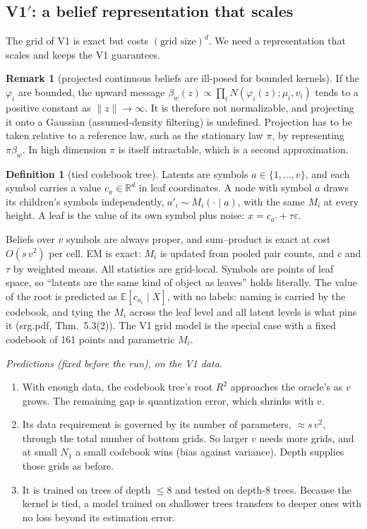 \documentclass[11pt]{article}
\theoremstyle{definition}
\newtheorem{definition}[theorem]{Definition}
\newtheorem{remark}[theorem]{Remark}
\newcommand{\E}{\mathbb{E}}
\newcommand{\norm}[1]{\lVert #1\rVert}
\newcommand{\R}{\mathbb R}
\begin{document}
\subsection{V1$'$: a belief representation that scales}\label{sec:v1p}
The grid of V1 is exact but costs $(\text{grid size})^d$. We need a representation that scales and keeps
the V1 guarantees.

\begin{remark}[projected continuous beliefs are ill-posed for bounded kernels]\label{rem:adf}
If the $\varphi_i$ are bounded, the upward message $\beta_w(z)\propto\prod_iN(\varphi_i(z);\mu_i,v_i)$ tends to a
positive constant as $\norm z\to\infty$. It is therefore not normalizable, and projecting it onto a
Gaussian (assumed-density filtering) is undefined. Projection has to be taken relative to a reference
law, such as the stationary law $\pi$, by representing $\pi\beta_w$. In high dimension $\pi$ is itself
intractable, which is a second approximation.
\end{remark}

\begin{definition}[tied codebook tree]\label{def:codebook}
Latents are symbols $a\in\{1,\dots,v\}$, and each symbol carries a value $c_a\in\R^d$ in leaf
coordinates. A node with symbol $a$ draws its children's symbols independently,
$a'_i\sim M_i(\cdot\mid a)$, with the same $M_i$ at every height. A leaf is the value of its own
symbol plus noise: $x=c_{a'}+\tau\varepsilon$.
\end{definition}
\noindent Beliefs over $v$ symbols are always proper, and sum--product is exact at cost
$O(s\,v^2)$ per cell. EM is exact: $M_i$ is updated from pooled pair counts, and $c$ and $\tau$ by
weighted means. All statistics are grid-local. Symbols are points of leaf space, so ``latents are the
same kind of object as leaves'' holds literally. The value of the root is predicted as
$\E[c_{a_\epsilon}\mid X]$, with no labels: naming is carried by the codebook, and tying the $M_i$ across
the leaf level and all latent levels is what pins it (srg.pdf, Thm.~5.3(2)). The V1 grid model is
the special case with a fixed codebook of 161 points and parametric $M_i$.

\emph{Predictions (fixed before the run), on the V1 data.}
\begin{enumerate}
\item[(Q1)] With enough data, the codebook tree's root $R^2$ approaches the oracle's as $v$ grows. The
remaining gap is quantization error, which shrinks with $v$.
\item[(Q2)] Its data requirement is governed by its number of parameters, $\approx s\,v^2$, through the total
number of bottom grids. So larger $v$ needs more grids, and at small $N_1$ a small codebook wins
(bias against variance). Depth supplies those grids as before.
\item[(Q3)] It is trained on trees of depth $\le8$ and tested on depth-8 trees. Because the kernel is tied,
a model trained on shallower trees transfers to deeper ones with no loss beyond its estimation error.
\end{enumerate}
\end{document}
